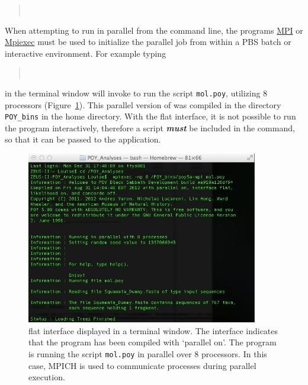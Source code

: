 \begin{quote}
\\
\end{quote}

When attempting to run \poy in parallel from the command line, the programs \href{http://www-unix.mcs.anl.gov/mpi/}{MPI} 
or \href {https://www.osc.edu/~djohnson/mpiexec/} {Mpiexec} must be used to initialize the parallel job 
from within a PBS batch or interactive environment.  For example typing

\begin{quote}
\\
\end{quote}
in the terminal window will invoke \poy to run the script \texttt{mol.poy}, utilizing 8 processors 
(Figure~\ref{fig:mpiexecscript}).  This parallel version of \poy was compiled in the directory 
\texttt{POY\_bins} in the home directory.  With the flat interface, it is not possible to run the 
program interactively, therefore a script \textbf {\emph{must}} be included in the command, so that it can 
be passed to the application.  

\begin{figure}
    \begin{center}
        \includegraphics[width=0.9\textwidth]{doc/figures/mpiexec_script.jpg}
    \end{center}
    \caption{\poy flat interface displayed in a terminal window. The interface indicates that the program 
    has been compiled with `parallel on'. The program is running the script \texttt{mol.poy} in parallel 
    over 8 processors. In this case, MPICH is used to communicate processes during  parallel execution.}
    \label{fig:mpiexecscript}
\end{figure}

